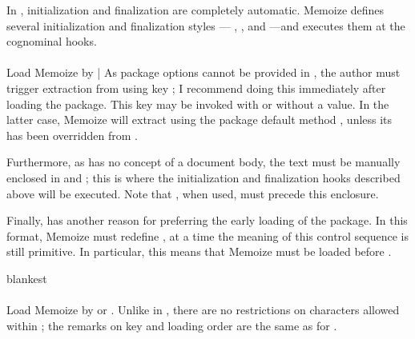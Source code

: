 \documentclass[a4paper,11pt]{article}
\begin{document}
In , initialization and finalization are completely automatic.
Memoize defines several initialization and finalization styles ---
, ,
 and 
---and executes them at the cognominal  hooks.

\paragraph{}{}

Load Memoize by |  As package options cannot be provided in
, the author must trigger extraction from 
using key ; I recommend doing this immediately after loading
the package.  This key may be invoked with or without a value.  In the latter
case, Memoize will extract using the package default method
, unless its has been overridden from
.

Furthermore, as  has no concept of a document body, the text
must be manually enclosed in  and ; this
is where the initialization and finalization hooks described above will be
executed.  Note that , when used, must precede this enclosure.

Finally,  has another reason for preferring the early loading
of the package.  In this format, Memoize must redefine , at a
time the meaning of this control sequence is still primitive.  In particular,
this means that Memoize must be loaded before .

\begin{tcboxedraster}[raster column skip=1cm]{blankest}
\end{tcboxedraster}

\paragraph{}{}

Load Memoize by  or
.  Unlike in ,
there are no restrictions on characters allowed within ; the
remarks on key  and loading order are the same as for
.
\end{document}
